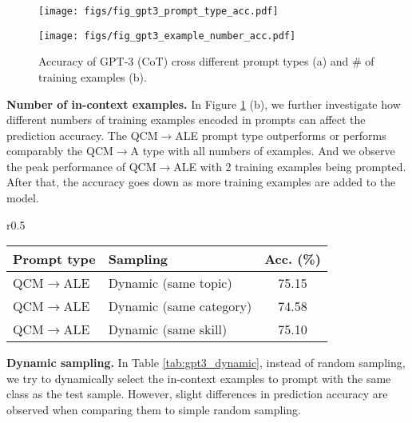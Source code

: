 \begin{figure}[ht] 
\begin{minipage}{0.49\textwidth} 
\centering
 \texttt{[image: figs/fig\_gpt3\_prompt\_type\_acc.pdf]}
\end{minipage}
 \hfill
 \begin{minipage}{0.49\textwidth} 
 \texttt{[image: figs/fig\_gpt3\_example\_number\_acc.pdf]}
 \end{minipage}
\caption{Accuracy of GPT-3 (CoT) cross different prompt types (a) and \# of training examples (b).}
\label{fig:gpt3_prompt}
\end{figure}


\textbf{Number of in-context examples.} In Figure \ref{fig:gpt3_prompt} (b), we further investigate how different numbers of training examples encoded in prompts can affect the prediction accuracy. The QCM$\rightarrow$ALE prompt type outperforms or performs comparably the QCM$\rightarrow$A type with all numbers of examples. And we observe the peak performance of QCM$\rightarrow$ALE with 2 training examples being prompted. After that, the accuracy goes down as more training examples are added to the model.


\begin{wraptable}{r}{0.5\textwidth}
\vspace{-3.5mm}
\centering
\fontsize{8.5pt}{\baselineskip}\selectfont \renewcommand\tabcolsep{3.0pt} \renewcommand\arraystretch{1.0} \begin{tabular}{llc} 
\hline
\textbf{Prompt type} & \textbf{Sampling} & \textbf{Acc. (\%)}  \\ 
\hline
QCM$\rightarrow$ALE & Dynamic (same topic) & 75.15  \\
QCM$\rightarrow$ALE & Dynamic (same category) & 74.58 \\
QCM$\rightarrow$ALE & Dynamic (same skill) & 75.10  \\
\hline
\end{tabular}
\vspace{-1mm}
\caption{Dynamic sampling for GPT-3 (CoT).}
\vspace{-6mm}
\label{tab:gpt3_dynamic}
\end{wraptable}

\textbf{Dynamic sampling.} In Table \ref{tab:gpt3_dynamic}, instead of random sampling, we try to dynamically select the in-context examples to prompt with the same class as the test sample. However, slight differences in prediction accuracy are observed when comparing them to simple random sampling.

